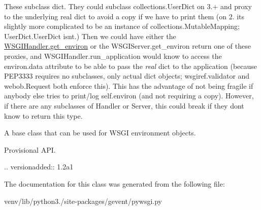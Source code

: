 These subclass dict. They could subclass collections.\+User\+Dict on 3.+ and proxy to the underlying real dict to avoid a copy if we have to print them (on 2. it\textquotesingle{}s slightly more complicated to be an instance of collections.\+Mutable\+Mapping; User\+Dict.\+User\+Dict isn\textquotesingle{}t.) Then we could have either the \hyperlink{classgevent_1_1pywsgi_1_1_w_s_g_i_handler_a8337b61957f372c7a6cc62e57298d182}{W\+S\+G\+I\+Handler.\+get\+\_\+environ} or the W\+S\+G\+I\+Server.\+get\+\_\+environ return one of these proxies, and W\+S\+G\+I\+Handler.\+run\+\_\+application would know to access the {\ttfamily environ.\+data} attribute to be able to pass the {\itshape real} dict to the application (because P\+E\+P3333 requires no subclasses, only actual dict objects; wsgiref.\+validator and webob.\+Request both enforce this). This has the advantage of not being fragile if anybody else tries to print/log self.\+environ (and not requiring a copy). However, if there are any subclasses of Handler or Server, this could break if they don\textquotesingle{}t know to return this type.\begin{DoxyVerb}A base class that can be used for WSGI environment objects.

Provisional API.

.. versionadded:: 1.2a1
\end{DoxyVerb}
 

The documentation for this class was generated from the following file\+:\begin{DoxyCompactItemize}
\item 
venv/lib/python3./site-\/packages/gevent/pywsgi.\+py\end{DoxyCompactItemize}
